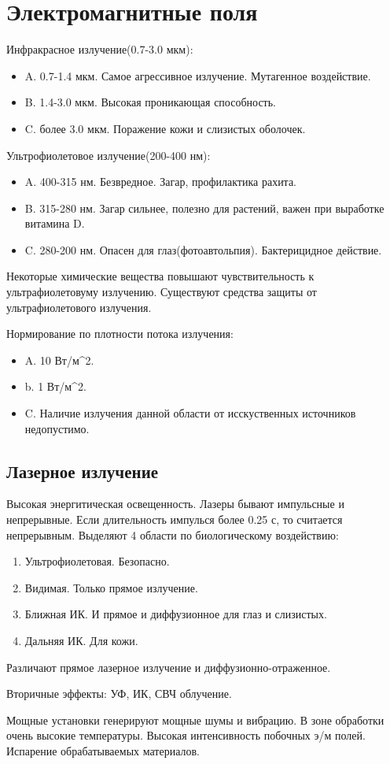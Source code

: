 \section{Электромагнитные поля}
Инфракрасное излучение(0.7-3.0 мкм):
\begin{itemize}
	\item A. 0.7-1.4 мкм. Самое агрессивное излучение. Мутагенное воздействие.
	\item B. 1.4-3.0 мкм. Высокая проникающая способность.
	\item C. более 3.0 мкм. Поражение кожи и слизистых оболочек.
\end{itemize}
Ультрофиолетовое излучение(200-400 нм):
\begin{itemize}
	\item A. 400-315 нм. Безвредное. Загар, профилактика рахита.
	\item B. 315-280 нм. Загар сильнее, полезно для растений, важен при выработке витамина D.
	\item C. 280-200 нм. Опасен для глаз(фотоавтольпия). Бактерицидное действие.
\end{itemize}
Некоторые химические вещества повышают чувствительность к ультрафиолетовуму излучению. Существуют средства защиты от ультрафиолетового излучения.

Нормирование по плотности потока излучения:
\begin{itemize}
	\item A. 10 Вт/м^2.
	\item b. 1 Вт/м^2.
	\item C. Наличие излучения данной области от исскуственных источников недопустимо.
\end{itemize}

\subsection{Лазерное излучение}
Высокая энергитическая освещенность. Лазеры бывают импульсные и непрерывные. Если длительность импулься более 0.25 с, то считается непрерывным. Выделяют 4 области по биологическому воздействию:
\begin{enumerate}
	\item Ультрофиолетовая. Безопасно.
	\item Видимая. Только прямое излучение.
	\item Ближная ИК. И прямое и диффузионное для глаз и слизистых.
	\item Дальняя ИК. Для кожи.
\end{enumerate}

Различают прямое лазерное излучение и диффузионно-отраженное.

Вторичные эффекты: УФ, ИК, СВЧ облучение.

Мощные установки генерируют мощные шумы и вибрацию. В зоне обработки очень высокие температуры. Высокая интенсивность побочных э/м полей. Испарение обрабатываемых материалов.
